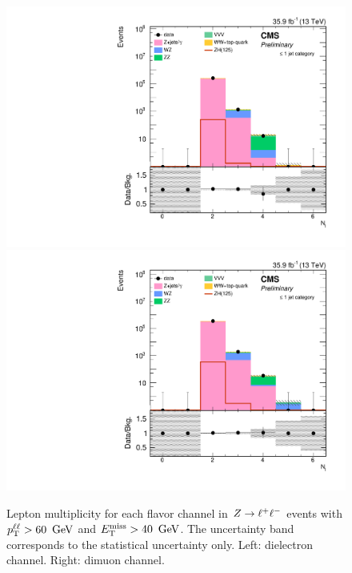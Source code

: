 \begin{figure}[hb]
\begin{center}
\includegraphics[width=\cmsFigWidth]{figures/zsel_nlep_ee.pdf}
\includegraphics[width=\cmsFigWidth]{figures/zsel_nlep_mm.pdf}
\caption{
  Lepton multiplicity for each flavor channel in $Z\to\ell^+\ell^-$ events with $p_{\mathrm{T}}^{\ell\ell} > 60~\,\text{Ge\hspace{-.08em}V}$ and $E_\mathrm{T}^{\mathrm{miss}} > 40~\,\text{Ge\hspace{-.08em}V}$. 
  The uncertainty band corresponds to the statistical uncertainty only. Left: dielectron channel. Right: dimuon channel.
}
\label{fig:distributions_zsel_nlep}
\end{center}
\end{figure}
